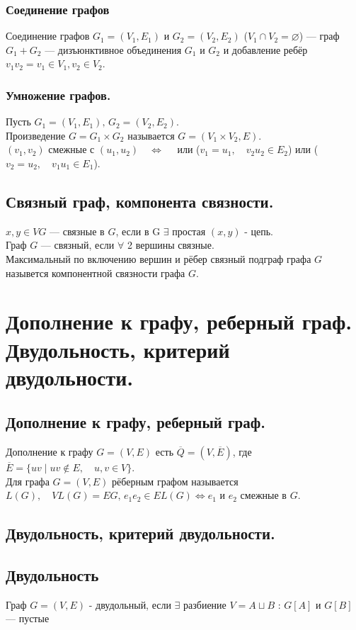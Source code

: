 \documentclass[12pt]{article}
\begin{document}
\subsubsection{Соединение графов}
	Соединение графов $G_1 = (V_1, E_1)$ и $G_2 = (V_2, E_2)$ ($ V_1 \cap V_2 = \varnothing$) — граф $G_1 + G_2$ — дизъюнктивное объединения $G_1$ и $G_2$ и добавление ребёр $v_1v_2 = v_1 \in V_1, v_2 \in V_2$.\\
\subsubsection{Умножение графов.}
	Пусть $G_1 = (V_1, E_1), \, G_2 = (V_2, E_2)$.\\
	Произведение $G = G_1 \times G_2$ называется $G = ( V_1 \times V_2, E)$.\\
	$(v_1, v_2)$ смежные с $(u_1, u_2)  \quad \Leftrightarrow \quad $ или ($ v_1 = u_1, \quad  v_2u_2 \in E_2 $) или ($ v_2 = u_2,  \quad v_1u_1 \in E_1$).
\subsection{Связный граф, компонента связности.}
	$x,y \in VG$ — связные в $G$, если в G $\exists$ простая $(x,y)$ - цепь.\\
	Граф $G$ — связный, если $\forall$ 2 вершины связные.\\
	Максимальный по включению вершин и рёбер связный подграф графа $G$ назывется компонентной связности графа $G$.

\section{Дополнение к графу, реберный граф. Двудольность, критерий двудольности.}
\subsection{Дополнение к графу, реберный граф.}
	Дополнение к графу $G = (V,E)$ есть $\overline{Q} = (V, \overline{E})$, где $\overline{E} = \{ uv \mid uv \not\in E, \quad u,v \in V \}$.\\
	Для графа $G = (V,E)$ рёберным графом называется $L(G), \quad VL(G) = EG, \, e_1e_2 \in EL(G) \Leftrightarrow e_1$ и $e_2$ смежные в $G$.

\subsection{Двудольность, критерий двудольности.}
\subsection{Двудольность}
	Граф $G=(V,E)$ - двудольный, если $\exists \text{ разбиение } V = A \sqcup B$ : $G[A]$ и $G[B]$ — пустые
\end{document}
